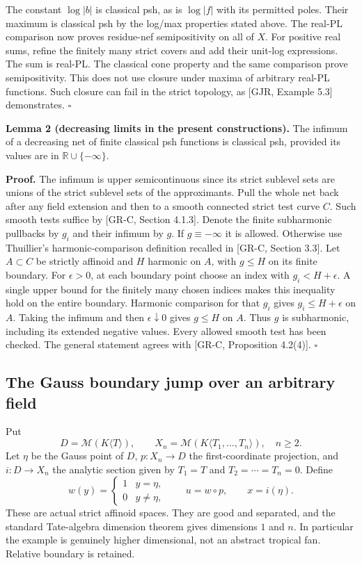 \documentclass[
  11pt,
]{article}
\begin{document}
The constant \(\log|b|\) is classical psh, as is \(\log|f|\) with its
permitted poles. Their maximum is classical psh by the log/max
properties stated above. The real-PL comparison now proves residue-nef
semipositivity on all of \(X\). For positive real sums, refine the
finitely many strict covers and add their unit-log expressions. The sum
is real-PL. The classical cone property and the same comparison prove
semipositivity. This does not use closure under maxima of arbitrary
real-PL functions. Such closure can fail in the strict topology, as
{[}GJR, Example 5.3{]} demonstrates. \(\square\)

\textbf{Lemma 2 (decreasing limits in the present constructions).} The
infimum of a decreasing net of finite classical psh functions is
classical psh, provided its values are in \(\mathbb R\cup\{-\infty\}\).

\textbf{Proof.} The infimum is upper semicontinuous since its strict
sublevel sets are unions of the strict sublevel sets of the
approximants. Pull the whole net back after any field extension and then
to a smooth connected strict test curve \(C\). Such smooth tests suffice
by {[}GR-C, Section 4.1.3{]}. Denote the finite subharmonic pullbacks by
\(g_i\) and their infimum by \(g\). If \(g\equiv-\infty\) it is allowed.
Otherwise use Thuillier's harmonic-comparison definition recalled in
{[}GR-C, Section 3.3{]}. Let \(A\subset C\) be strictly affinoid and
\(H\) harmonic on \(A\), with \(g\le H\) on its finite boundary. For
\(\epsilon>0\), at each boundary point choose an index with
\(g_i<H+\epsilon\). A single upper bound for the finitely many chosen
indices makes this inequality hold on the entire boundary. Harmonic
comparison for that \(g_i\) gives \(g_i\le H+\epsilon\) on \(A\). Taking
the infimum and then \(\epsilon\downarrow0\) gives \(g\le H\) on \(A\).
Thus \(g\) is subharmonic, including its extended negative values. Every
allowed smooth test has been checked. The general statement agrees with
{[}GR-C, Proposition 4.2(4){]}. \(\square\)

\subsection{The Gauss boundary jump over an arbitrary
field}\label{the-gauss-boundary-jump-over-an-arbitrary-field}

Put \[D=\mathcal M(K\langle T\rangle),\qquad
X_n=\mathcal M(K\langle T_1,\ldots,T_n\rangle),\quad n\ge2.\] Let
\(\eta\) be the Gauss point of \(D\), \(p:X_n\to D\) the
first-coordinate projection, and \(i:D\to X_n\) the analytic section
given by \(T_1=T\) and \(T_2=\cdots=T_n=0\). Define
\[w(y)=\begin{cases}1&y=\eta,\\0&y\ne\eta,\end{cases}
\qquad u=w\circ p,\qquad x=i(\eta).\] These are actual strict affinoid
spaces. They are good and separated, and the standard Tate-algebra
dimension theorem gives dimensions \(1\) and \(n\). In particular the
example is genuinely higher dimensional, not an abstract tropical fan.
Relative boundary is retained.
\end{document}
